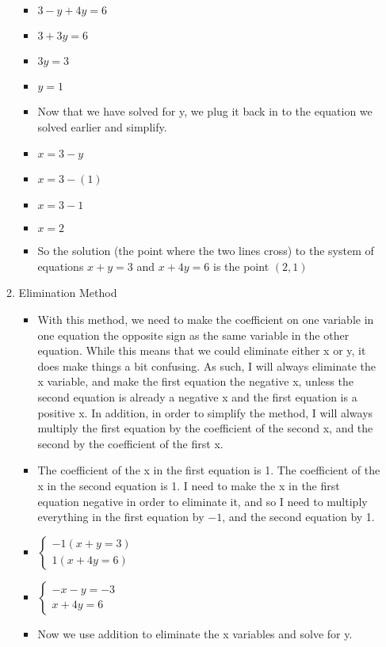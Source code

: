 \begin{enumerate}
\begin{enumerate}
\begin{itemize}
    \item [] $3-y+4y=6$
    \item [] $3+3y=6$
    \item [] $3y=3$
    \item [] $y=1$
    \item Now that we have solved for y, we plug it back in to the equation we solved earlier and simplify.
    \item [] $x=3-y$
    \item [] $x=3-(1)$
    \item [] $x=3-1$
    \item [] $x=2$
    \item So the solution (the point where the two lines cross) to the system of equations $x+y=3$ and $x+4y=6$ is the point $(2,1)$
    \end{itemize}
  \item Elimination Method
    \begin{itemize}
    \item With this method, we need to make the coefficient on one variable in one equation the opposite sign as the same variable in the other equation. While this means that we could eliminate either x or y, it does make things a bit confusing. As such, I will always eliminate the x variable, and make the first equation the negative x, unless the second equation is already a negative x and the first equation is a positive x. In addition, in order to simplify the method, I will always multiply the first equation by the coefficient of the second x, and the second by the coefficient of the first x.
    \item The coefficient of the x in the first equation is 1. The coefficient of the x in the second equation is 1. I need to make the x in the first equation negative in order to eliminate it, and so I need to multiply everything in the first equation by $-1$, and the second equation by 1.
    \item []  $\left\{ \begin{array}{l}
              -1(x+y =3) \\
              1(x+4y=6) \end{array} \right.$
    \item []  $\left\{ \begin{array}{l}
              -x-y=-3 \\
              x+4y=6 \end{array} \right.$
    \item Now we use addition to eliminate the x variables and solve for y.

\end{itemize}
\end{enumerate}
\end{enumerate}
